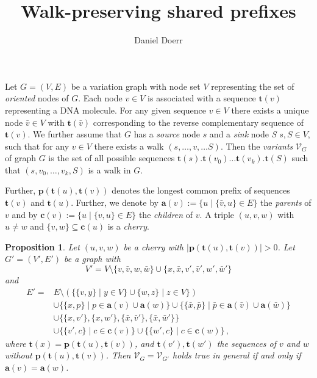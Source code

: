 \documentclass[a4paper]{article}
\title{Walk-preserving shared prefixes}
\author{Daniel Doerr}
\newtheorem{proposition}{Proposition}
\newcommand{\prefix}{\mathbf{p}}
\newcommand{\parent}{\mathbf{a}}
\newcommand{\child}{\mathbf{c}}
\newcommand{\seq}{\mathbf{t}}
\begin{document}
\maketitle

Let $G = (V, E)$ be a variation graph with node set $V$ representing the set of
\emph{oriented} nodes of $G$. Each node $v \in V$ is associated with a sequence
$\seq(v)$ representing a DNA molecule. For any given sequence $v \in V$ there exists
a unique node $\bar v \in V$ with $\seq(\bar v)$ corresponding to the 
reverse complementary sequence of $\seq(v)$. We further assume that $G$  has a
\emph{source} node $s$ and a \emph{sink} node \emph{S} $s, S \in V$, such that
for any $v \in V$ there exists a walk $(s,\ldots, v, \ldots S)$. Then the
\emph{variants} $\mathcal V_G$ of graph $G$ is the set of all possible sequences
$\seq(s).\seq(v_0)\ldots\seq(v_k).\seq(S)$ such that $(s, v_0, \ldots, v_k, S )$ is
a walk in $G$. 

Further, $\prefix(\seq(u), \seq(v))$ denotes the longest common prefix of
sequences $\seq(v)$ and $\seq(u)$. Further, we denote by $\parent(v) := \{u
\mid \{\bar v, u\} \in E\}$ the \emph{parents} of $v$ and by $\child(v) := \{u
\mid \{v, u\} \in E\}$ the \emph{children} of $v$. A triple $(u, v, w)$ with $u
\neq w$ and $\{v, w\} \subseteq\child(u)$ is a \emph{cherry}. 

\begin{proposition}
    Let $(u, v, w)$ be a cherry with $|\prefix(\seq(u), \seq(v))| > 0$. Let $G' =
    (V', E')$ be a graph with 
    \[
        V' = V \setminus \{v, \bar v, w, \bar w\} \cup \{x, \bar x, v', \bar
        v', w', \bar w'\}
    \]
    and 
    \begin{align*}
        E' = & E \setminus (\{\{v, y\} \mid y \in V\} \cup \{w, z\} \mid z \in
        V\}) \\
        & \cup \{\{x, p\} \mid p \in \parent(v) \cup \parent(w)\} \cup
        \{\{\bar x, \bar p \} \mid \bar p \in \parent(\bar v) \cup \parent(\bar
        w) \} \\
        & \cup \{\{x, v'\}, \{x, w'\}, \{\bar x, \bar v'\}, \{\bar x, \bar
        w'\}\} \\
        & \cup \{\{v', c\} \mid c \in \child(v) \} \cup \{\{w', c\} \mid c \in
        \child(w)\}\,,
    \end{align*}
    where $\seq(x) = \prefix(\seq(u), \seq(v))$, and $\seq(v'), \seq(w')$ the
    sequences of $v$ and $w$ without $\prefix(\seq(u), \seq(v))$. 
    Then $\mathcal V_G = \mathcal V_{G'}$ holds true in general if and only if
    $\parent(v) = \parent(w)$.
\end{proposition}
\end{document}
